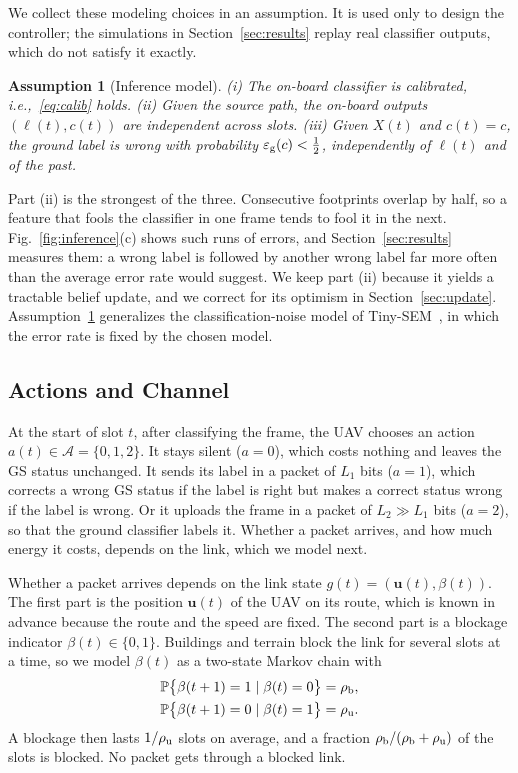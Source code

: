 \documentclass[journal]{IEEEtran}
\newtheorem{assumption}{Assumption}
\theoremstyle{remark}
\newcommand{\Prob}{\mathbb{P}}
\newcommand{\A}{\mathcal{A}}
\newcommand{\lab}{\ell}
\newcommand{\ee}{\varepsilon}
\begin{document}
We collect these modeling choices in an assumption. It is used only to design the controller; the simulations in Section~\ref{sec:results} replay real classifier outputs, which do not satisfy it exactly.

\begin{assumption}[Inference model]\label{as:inf}
(i) The on-board classifier is calibrated, i.e.,~\eqref{eq:calib} holds. (ii) Given the source path, the on-board outputs $(\lab(t),c(t))$ are independent across slots. (iii) Given $X(t)$ and $c(t)=c$, the ground label is wrong with probability $\ee_{\rm g}(c)<\tfrac12$, independently of $\lab(t)$ and of the past.
\end{assumption}

Part (ii) is the strongest of the three. Consecutive footprints overlap by half, so a feature that fools the classifier in one frame tends to fool it in the next. Fig.~\ref{fig:inference}(c) shows such runs of errors, and Section~\ref{sec:results} measures them: a wrong label is followed by another wrong label far more often than the average error rate would suggest. We keep part (ii) because it yields a tractable belief update, and we correct for its optimism in Section~\ref{sec:update}. Assumption~\ref{as:inf} generalizes the classification-noise model of Tiny-SEM~\cite{hosny2026tinysem}, in which the error rate is fixed by the chosen model.

\subsection{Actions and Channel}\label{sec:act}
At the start of slot $t$, after classifying the frame, the UAV chooses an action $a(t)\in\A=\{0,1,2\}$. It stays silent ($a=0$), which costs nothing and leaves the GS status unchanged. It sends its label in a packet of $L_1$ bits ($a=1$), which corrects a wrong GS status if the label is right but makes a correct status wrong if the label is wrong. Or it uploads the frame in a packet of $L_2\gg L_1$ bits ($a=2$), so that the ground classifier labels it. Whether a packet arrives, and how much energy it costs, depends on the link, which we model next.

Whether a packet arrives depends on the link state $g(t)=(\mathbf{u}(t),\beta(t))$. The first part is the position $\mathbf{u}(t)$ of the UAV on its route, which is known in advance because the route and the speed are fixed. The second part is a blockage indicator $\beta(t)\in\{0,1\}$. Buildings and terrain block the link for several slots at a time, so we model $\beta(t)$ as a two-state Markov chain with
\begin{equation}\label{eq:block}
\begin{split}
\Prob\big\{\beta(t+1)=1\mid\beta(t)=0\big\}&=\rho_{\rm b},\\
\Prob\big\{\beta(t+1)=0\mid\beta(t)=1\big\}&=\rho_{\rm u}.
\end{split}
\end{equation}
A blockage then lasts $1/\rho_{\rm u}$ slots on average, and a fraction $\rho_{\rm b}/(\rho_{\rm b}+\rho_{\rm u})$ of the slots is blocked. No packet gets through a blocked link.
\end{document}
